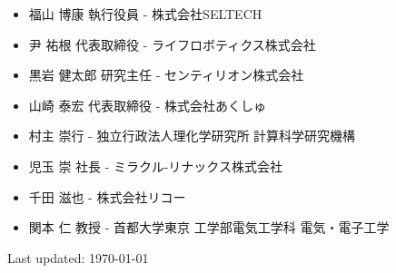 \documentclass[letterpaper]{article}
\def\footer{
  \begin{center}
    \begin{footnotesize}
      Last updated: \today
    \end{footnotesize}
  \end{center}
}
\begin{document}
\begin{itemize}
  \item 福山 博康 執行役員 - 株式会社SELTECH
  \item 尹 祐根 代表取締役 - ライフロボティクス株式会社
  \item 黒岩 健太郎 研究主任 - センティリオン株式会社
  \item 山崎 泰宏 代表取締役 - 株式会社あくしゅ
  \item 村主 崇行 - 独立行政法人理化学研究所 計算科学研究機構
  \item 児玉 崇 社長 - ミラクル-リナックス株式会社
  \item 千田 滋也 - 株式会社リコー
  \item 関本 仁 教授 - 首都大学東京 工学部電気工学科 電気・電子工学
\end{itemize}

\bigskip
\footer
\end{document}
